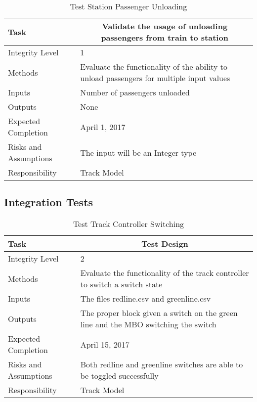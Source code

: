 \documentclass[]{article}
\begin{document}
\begin{table}[H]
	\centering
	\caption{Test Station Passenger Unloading}
	\begin{tabular}{|l|l|}
		\hline
		Task & \multicolumn{1}{c|}{Validate the usage of unloading passengers from train to station} \\ \hline
		Integrity Level & 1 \\ \hline
		Methods & Evaluate the functionality of the ability to unload passengers for multiple input values \\ \hline
		Inputs &  Number of passengers unloaded\\ \hline
		Outputs &  \parbox[t]{10cm}{None}\\ \hline
		Expected Completion & April 1, 2017\\ \hline
		Risks and Assumptions & The input will be an Integer type \\ \hline
		Responsibility & Track Model\\ \hline
	\end{tabular}
\end{table}




\subsection{Integration Tests}

\begin{table}[H]
	\centering
	\caption{Test Track Controller Switching}
	\begin{tabular}{|l|l|}
		\hline
		Task & \multicolumn{1}{c|}{Test Design} \\ \hline
		Integrity Level & 2 \\ \hline
		Methods & Evaluate the functionality of the track controller to switch a switch state \\ \hline
		Inputs &  The files redline.csv and greenline.csv \\ \hline
		Outputs &  \parbox[t]{10cm}{The proper block given a switch on the green line and the MBO switching the switch}\\ \hline
		Expected Completion & April 15, 2017\\ \hline
		Risks and Assumptions & Both redline and greenline switches are able to be toggled successfully \\ \hline
		Responsibility & Track Model\\ \hline
	\end{tabular}
\end{table}
\end{document}
